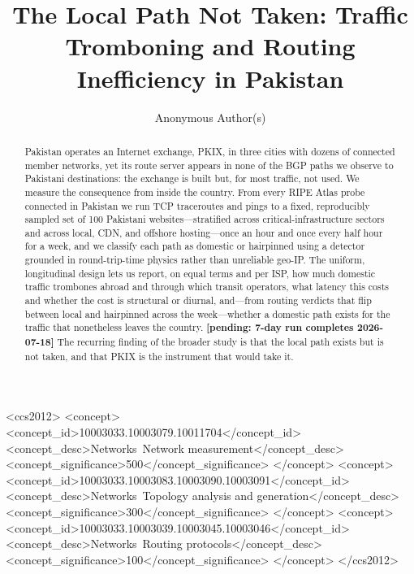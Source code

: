 \documentclass[sigconf,anonymous,10pt]{acmart}
\newcommand{\pending}{\textbf{[pending: 7-day run completes 2026-07-18]}}
\begin{document}
\title{The Local Path Not Taken: Traffic Tromboning and Routing Inefficiency in Pakistan}

\author{Anonymous Author(s)}

\renewcommand{\shortauthors}{Anonymous et al.}

\begin{abstract}
Pakistan operates an Internet exchange, PKIX, in three cities with dozens of connected member
networks, yet its route server appears in none of the BGP paths we observe to Pakistani
destinations: the exchange is built but, for most traffic, not used. We measure the consequence
from inside the country. From every RIPE Atlas probe connected in Pakistan we run TCP traceroutes
and pings to a fixed, reproducibly sampled set of 100 Pakistani websites---stratified across
critical-infrastructure sectors and across local, CDN, and offshore hosting---once an hour and once
every half hour for a week, and we classify each path as domestic or hairpinned using a detector
grounded in round-trip-time physics rather than unreliable geo-IP. The uniform, longitudinal design
lets us report, on equal terms and per ISP, how much domestic traffic trombones abroad and through
which transit operators, what latency this costs and whether the cost is structural or diurnal,
and---from routing verdicts that flip between local and hairpinned across the week---whether a
domestic path exists for the traffic that nonetheless leaves the country. \pending{} The recurring
finding of the broader study is that the local path exists but is not taken, and that PKIX is the
instrument that would take it.
\end{abstract}



\begin{CCSXML}
<ccs2012>
<concept>
<concept_id>10003033.10003079.10011704</concept_id>
<concept_desc>Networks~Network measurement</concept_desc>
<concept_significance>500</concept_significance>
</concept>
<concept>
<concept_id>10003033.10003083.10003090.10003091</concept_id>
<concept_desc>Networks~Topology analysis and generation</concept_desc>
<concept_significance>300</concept_significance>
</concept>
<concept>
<concept_id>10003033.10003039.10003045.10003046</concept_id>
<concept_desc>Networks~Routing protocols</concept_desc>
<concept_significance>100</concept_significance>
</concept>
</ccs2012>
\end{CCSXML}
\end{document}

